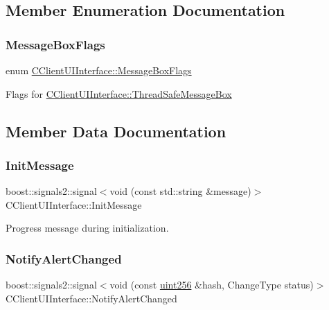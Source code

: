 \subsection{Member Enumeration Documentation}
\mbox{\label{class_c_client_u_i_interface_a568cf07ecac3fac224d63b42a32e8bc1}} 
\subsubsection{\texorpdfstring{MessageBoxFlags}{MessageBoxFlags}}
{\footnotesize\ttfamily enum \mbox{\hyperlink{class_c_client_u_i_interface_a568cf07ecac3fac224d63b42a32e8bc1}{C\+Client\+U\+I\+Interface\+::\+Message\+Box\+Flags}}}

Flags for \mbox{\hyperlink{class_c_client_u_i_interface_a5bc5d70a8113304ede47126cb6109e8a}{C\+Client\+U\+I\+Interface\+::\+Thread\+Safe\+Message\+Box}} 

\subsection{Member Data Documentation}
\mbox{\label{class_c_client_u_i_interface_abc63cc3f3e5e15632f713d859dbc6bc2}} 
\subsubsection{\texorpdfstring{InitMessage}{InitMessage}}
{\footnotesize\ttfamily boost\+::signals2\+::signal$<$void (const std\+::string \&message)$>$ C\+Client\+U\+I\+Interface\+::\+Init\+Message}

Progress message during initialization. \mbox{\label{class_c_client_u_i_interface_a2c42ebdda06512513445cd86881b157a}} 
\subsubsection{\texorpdfstring{NotifyAlertChanged}{NotifyAlertChanged}}
{\footnotesize\ttfamily boost\+::signals2\+::signal$<$void (const \mbox{\hyperlink{classuint256}{uint256}} \&hash, Change\+Type status)$>$ C\+Client\+U\+I\+Interface\+::\+Notify\+Alert\+Changed}


